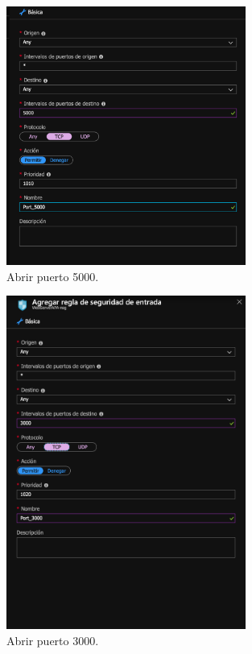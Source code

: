 \documentclass[english,runningheads,a4paper]{llncs}[2018/03/10]
\begin{document}
\begin{figure}[H]
 \centering
 \includegraphics[width=0.7\textwidth]{./Web/Azure/Azure2.png}
 \caption{Abrir puerto 5000.}
\end{figure}

\begin{figure}[H]
 \centering
 \includegraphics[width=0.7\textwidth]{./Web/Azure/Azure3.png}
 \caption{Abrir puerto 3000.}
\end{figure}
\end{document}
